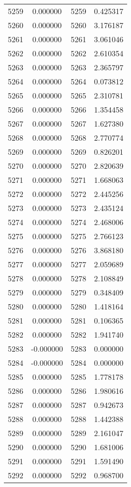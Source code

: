 \documentclass[12pt]{article}
\begin{document}
\begin{longtable}{@{}cccc@{}}
5259 & 0.000000 & 5259 & 0.425317 \\
5260 & 0.000000 & 5260 & 3.176187 \\
5261 & 0.000000 & 5261 & 3.061046 \\
5262 & 0.000000 & 5262 & 2.610354 \\
5263 & 0.000000 & 5263 & 2.365797 \\
5264 & 0.000000 & 5264 & 0.073812 \\
5265 & 0.000000 & 5265 & 2.310781 \\
5266 & 0.000000 & 5266 & 1.354458 \\
5267 & 0.000000 & 5267 & 1.627380 \\
5268 & 0.000000 & 5268 & 2.770774 \\
5269 & 0.000000 & 5269 & 0.826201 \\
5270 & 0.000000 & 5270 & 2.820639 \\
5271 & 0.000000 & 5271 & 1.668063 \\
5272 & 0.000000 & 5272 & 2.445256 \\
5273 & 0.000000 & 5273 & 2.435124 \\
5274 & 0.000000 & 5274 & 2.468006 \\
5275 & 0.000000 & 5275 & 2.766123 \\
5276 & 0.000000 & 5276 & 3.868180 \\
5277 & 0.000000 & 5277 & 2.059689 \\
5278 & 0.000000 & 5278 & 2.108849 \\
5279 & 0.000000 & 5279 & 0.348409 \\
5280 & 0.000000 & 5280 & 1.418164 \\
5281 & 0.000000 & 5281 & 0.106365 \\
5282 & 0.000000 & 5282 & 1.941740 \\
5283 & -0.000000 & 5283 & 0.000000 \\
5284 & -0.000000 & 5284 & 0.000000 \\
5285 & 0.000000 & 5285 & 1.778178 \\
5286 & 0.000000 & 5286 & 1.980616 \\
5287 & 0.000000 & 5287 & 0.942673 \\
5288 & 0.000000 & 5288 & 1.442388 \\
5289 & 0.000000 & 5289 & 2.161047 \\
5290 & 0.000000 & 5290 & 1.681006 \\
5291 & 0.000000 & 5291 & 1.591490 \\
5292 & 0.000000 & 5292 & 0.968700 \\

\end{longtable}
\end{document}
